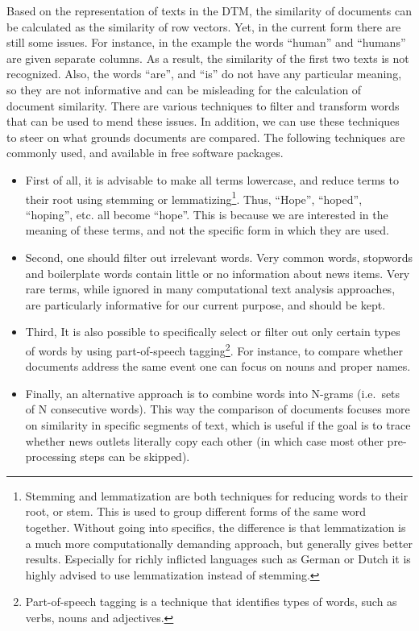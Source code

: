 Based on the representation of texts in the DTM, the similarity of
documents can be calculated as the similarity of row vectors. Yet, in
the current form there are still some issues. For instance, in the
example the words ``human'' and ``humans'' are given separate columns.
As a result, the similarity of the first two texts is not recognized.
Also, the words ``are'', and ``is'' do not have any particular meaning,
so they are not informative and can be misleading for the calculation of
document similarity. There are various techniques to filter and
transform words that can be used to mend these issues. In addition, we
can use these techniques to steer on what grounds documents are
compared. The following techniques are commonly used, and available in
free software packages.

\begin{itemize}
\item
  First of all, it is advisable to make all terms lowercase, and reduce
  terms to their root using stemming or lemmatizing\footnote{Stemming
    and lemmatization are both techniques for reducing words to their
    root, or stem. This is used to group different forms of the same
    word together. Without going into specifics, the difference is that
    lemmatization is a much more computationally demanding approach, but
    generally gives better results. Especially for richly inflicted
    languages such as German or Dutch it is highly advised to use
    lemmatization instead of stemming.}. Thus, ``Hope'', ``hoped'',
  ``hoping'', etc. all become ``hope''. This is because we are
  interested in the meaning of these terms, and not the specific form in
  which they are used.
\item
  Second, one should filter out irrelevant words. Very common words,
  stopwords and boilerplate words contain little or no information about
  news items. Very rare terms, while ignored in many computational text
  analysis approaches, are particularly informative for our current
  purpose, and should be kept.
\item
  Third, It is also possible to specifically select or filter out only
  certain types of words by using part-of-speech tagging\footnote{Part-of-speech
    tagging is a technique that identifies types of words, such as
    verbs, nouns and adjectives.}. For instance, to compare whether
  documents address the same event one can focus on nouns and proper
  names.
\item
  Finally, an alternative approach is to combine words into N-grams
  (i.e.~sets of N consecutive words). This way the comparison of
  documents focuses more on similarity in specific segments of text,
  which is useful if the goal is to trace whether news outlets literally
  copy each other (in which case most other pre-processing steps can be
  skipped).
\end{itemize}

